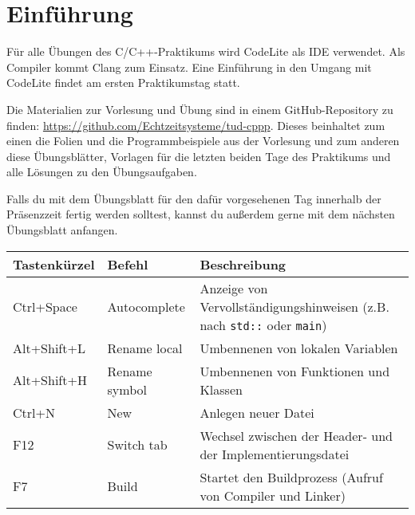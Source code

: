 
\section*{Einführung}
Für alle Übungen des C/C++-Praktikums wird CodeLite als IDE verwendet. Als Compiler kommt Clang zum Einsatz.
Eine Einführung in den Umgang mit CodeLite findet am ersten Praktikumstag statt.

Die Materialien zur Vorlesung und Übung sind in einem GitHub-Repository zu finden: \url{https://github.com/Echtzeitsysteme/tud-cppp}.
Dieses beinhaltet zum einen die Folien und die Programmbeispiele aus der Vorlesung und zum anderen diese Übungsblätter, Vorlagen für die letzten beiden Tage des Praktikums und alle Lösungen zu den Übungsaufgaben.

Falls du mit dem Übungsblatt für den dafür vorgesehenen Tag innerhalb der Präsenzzeit fertig werden solltest, kannst du außerdem gerne mit dem nächsten Übungsblatt anfangen.



\begin{tabular}{l|l|p{11.5cm}}
    \toprule
    \textbf{Tastenkürzel} & \textbf{Befehl} & \textbf{Beschreibung}\\
    \midrule
	Ctrl+Space & Autocomplete &
	Anzeige von Vervollständigungshinweisen (z.B. nach \texttt{std::} oder \texttt{main})
	\\
	Alt+Shift+L & Rename local &
	Umbennenen von lokalen Variablen
	\\
	Alt+Shift+H & Rename symbol &
	Umbennenen von Funktionen und Klassen
	\\
	Ctrl+N & New &
	Anlegen neuer Datei
	\\
	F12 & Switch tab &
	Wechsel zwischen der Header- und der Implementierungsdatei
	\\
	F7 & Build &
	Startet den Buildprozess (Aufruf von Compiler und Linker)
    \\\bottomrule
\end{tabular}
